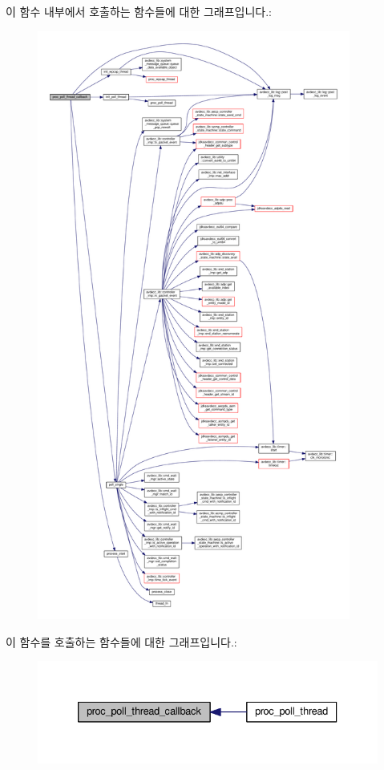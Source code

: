 이 함수 내부에서 호출하는 함수들에 대한 그래프입니다.\+:
\nopagebreak
\begin{figure}[H]
\begin{center}
\leavevmode
\includegraphics[height=550pt]{classavdecc__lib_1_1system__layer2__multithreaded__callback_aa3e8732e32ef9126093c67a1cc0d59f3_cgraph}
\end{center}
\end{figure}




이 함수를 호출하는 함수들에 대한 그래프입니다.\+:
\nopagebreak
\begin{figure}[H]
\begin{center}
\leavevmode
\includegraphics[width=333pt]{classavdecc__lib_1_1system__layer2__multithreaded__callback_aa3e8732e32ef9126093c67a1cc0d59f3_icgraph}
\end{center}
\end{figure}



